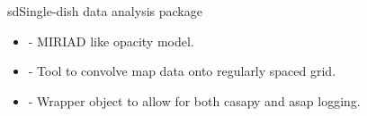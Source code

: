\begin{ahmodule}{sd}{Single-dish data analysis package}
\begin{ahdescription}
\begin{itemize}
\item {} - MIRIAD like opacity model.

\item {} - Tool to convolve map data onto regularly spaced grid.

\item {} - Wrapper object to allow for both casapy and asap logging.

\end{itemize}


\end{ahdescription}

\ahobjs{}
\ahfuncs{}



\end{ahmodule}
